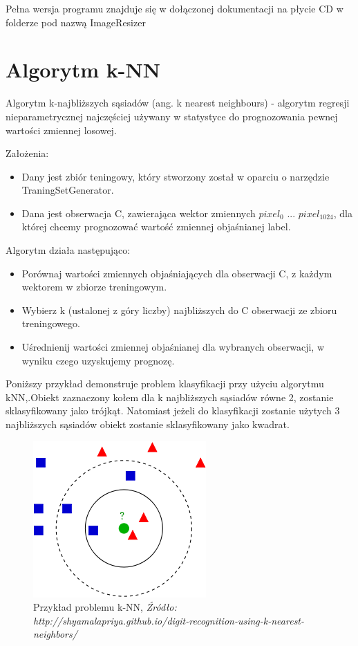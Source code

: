 \documentclass[brudnopis]{xmgr}
\begin{document}
Pełna wersja programu znajduje się w dołączonej dokumentacji na płycie CD w folderze pod nazwą ImageResizer

\section{Algorytm k-NN}

Algorytm k-najbliższych sąsiadów (ang. k nearest neighbours)\cite{2}\cite{11} - algorytm regresji nieparametrycznej najczęściej używany w statystyce do prognozowania pewnej wartości zmiennej losowej.
\newpage

Założenia:
\begin{itemize}
\item
Dany jest zbiór teningowy, który stworzony został w oparciu o narzędzie TraningSetGenerator.
\item
Dana jest obserwacja C, zawierająca wektor zmiennych $pixel_{0}$ ... $pixel_{1024}$, dla której chcemy prognozować wartość zmiennej objaśnianej label.
\end{itemize}	

Algorytm działa następująco:
\begin{itemize}
\item
Porównaj wartości zmiennych objaśniających dla obserwacji C, z każdym wektorem w zbiorze treningowym.
\item
Wybierz k (ustalonej z góry liczby) najbliższych do C obserwacji ze zbioru treningowego.
\item
Uśrednienij wartości zmiennej objaśnianej dla wybranych obserwacji, w wyniku czego uzyskujemy prognozę.	
\end{itemize}	
     
Poniższy przykład demonstruje problem klasyfikacji przy użyciu algorytmu kNN,.Obiekt zaznaczony kołem dla k najbliższych sąsiadów równe 2, zostanie sklasyfikowany jako trójkąt. Natomiast jeżeli do klasyfikacji zostanie użytych 3 najbliższych sąsiadów obiekt zostanie sklasyfikowany jako kwadrat.

\begin{figure}[!tbh]
\centering
\includegraphics[width=.4\hsize]{fig/knn}
\caption{Przykład problemu k-NN, \emph{Źródło: http://shyamalapriya.github.io/digit-recognition-using-k-nearest-neighbors/}}
\end{figure}
\newpage
\end{document}
